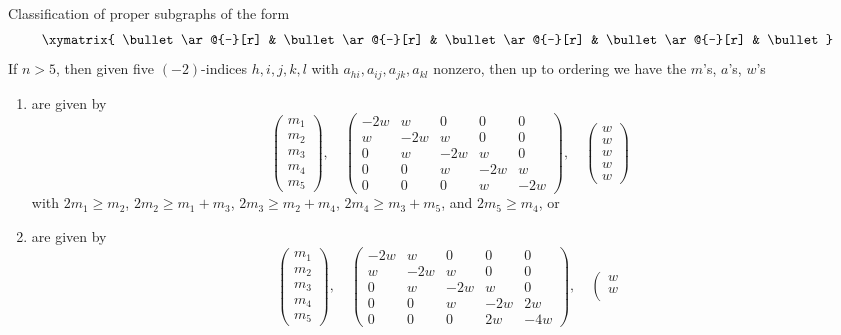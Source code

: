 \begin{lemma}
\label{lemma-five-by-five}
Classification of proper subgraphs of the form
$$
\xymatrix{
\bullet \ar@{-}[r] &
\bullet \ar@{-}[r] &
\bullet \ar@{-}[r] &
\bullet \ar@{-}[r] &
\bullet
}
$$
If $n > 5$, then given five $(-2)$-indices $h, i, j, k, l$
with $a_{hi}, a_{ij}, a_{jk}, a_{kl}$ nonzero, then up
to ordering we have the $m$'s, $a$'s, $w$'s
\begin{enumerate}
\item
\label{item-A5}
are given by
$$
\left(
\begin{matrix}
m_1 \\
m_2 \\
m_3 \\
m_4 \\
m_5
\end{matrix}
\right),
\quad
\left(
\begin{matrix}
-2w & w & 0 & 0 & 0 \\
w & -2w & w & 0 & 0 \\
0 & w & -2w & w & 0 \\
0 & 0 & w & -2w & w \\
0 & 0 & 0 & w & -2w
\end{matrix}
\right),
\quad
\left(
\begin{matrix}
w \\
w \\
w \\
w \\
w
\end{matrix}
\right)
$$
with $2m_1 \geq m_2$, $2m_2 \geq m_1 + m_3$, $2m_3 \geq m_2 + m_4$,
$2m_4 \geq m_3 + m_5$, and $2m_5 \geq m_4$, or
\item
\label{item-C5}
are given by
$$
\left(
\begin{matrix}
m_1 \\
m_2 \\
m_3 \\
m_4 \\
m_5
\end{matrix}
\right),
\quad
\left(
\begin{matrix}
-2w & w & 0 & 0 & 0 \\
w & -2w & w & 0 & 0 \\
0 & w & -2w & w & 0 \\
0 & 0 & w & -2w & 2w \\
0 & 0 & 0 & 2w & -4w
\end{matrix}
\right),
\quad
\left(
\begin{matrix}
w \\
w \\

\end{matrix}$$
\end{enumerate}
\end{lemma}
